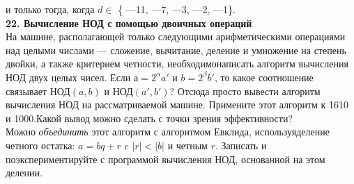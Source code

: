 и только тогда, когда $d \in$  \{ —11, —7, —3, —2, —1\}. 
\\
 \newline
\noindent\textbf{22. Вычисление НОД с помощью двоичных операций}\\
 \newline
\hspace*{10pt} На машине, располагающей только следующими арифметическими\linebreak
операциями над целыми числами — сложение, вычитание, деление и\linebreak
умножение на степень двойки, а также критерием четности, необходимо\linebreak написать алгоритм вычисления НОД двух целых чисел.
 \newline
\hspace*{10pt} Если $а = 2^\alpha a'$ и $b = 2^\beta b'$, то какое соотношение связывает НОД$(a, b)$\linebreak
и НОД$(a', b')$? Отсюда просто вывести алгоритм вычисления НОД на\linebreak
рассматриваемой машине. Примените этот алгоритм к 1610 и 1000.\linebreak Какой вывод можно сделать с точки зрения эффективности?\\
\hspace*{10pt} Можно \textit{объединить} этот алгоритм с алгоритмом Евклида, используя\linebreak деление четного остатка: $a = bq + r$ c $|r| < |b|$ и четным $r$. Записать\linebreak
и поэкспериментируйте с программой вычисления НОД, основанной на\linebreak
этом делении.\pagebreak


